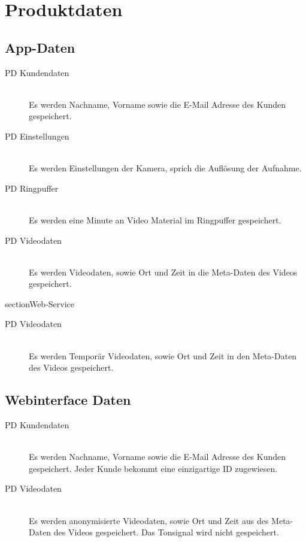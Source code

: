 \chapter{Produktdaten}

\section{App-Daten}
\begin{description}
\item[PD Kundendaten]\hfill \\
Es werden Nachname, Vorname sowie die E-Mail Adresse des Kunden gespeichert.
\item[PD Einstellungen]\hfill \\
Es werden Einstellungen der Kamera, sprich die Auflösung der Aufnahme.
\item[PD Ringpuffer]\hfill \\
Es werden eine Minute an Video Material im Ringpuffer gespeichert.
\item[PD Videodaten]\hfill \\
Es werden Videodaten, sowie Ort und Zeit in die Meta-Daten des Videos gespeichert.
\end{description}

section{Web-Service}
\begin{description}
\item[PD Videodaten]\hfill \\
Es werden Temporär Videodaten, sowie Ort und Zeit in den Meta-Daten des Videos gespeichert.
\end{description}

\section{Webinterface Daten}
\begin{description}
\item[PD Kundendaten]\hfill \\
Es werden Nachname, Vorname sowie die E-Mail Adresse des Kunden gespeichert. Jeder Kunde bekommt eine einzigartige ID zugewiesen.
\item[PD Videodaten]\hfill \\
Es werden anonymisierte Videodaten, sowie Ort und Zeit aus des Meta-Daten des Videos gespeichert. Das Tonsignal wird nicht gespeichert.
\end{description}


